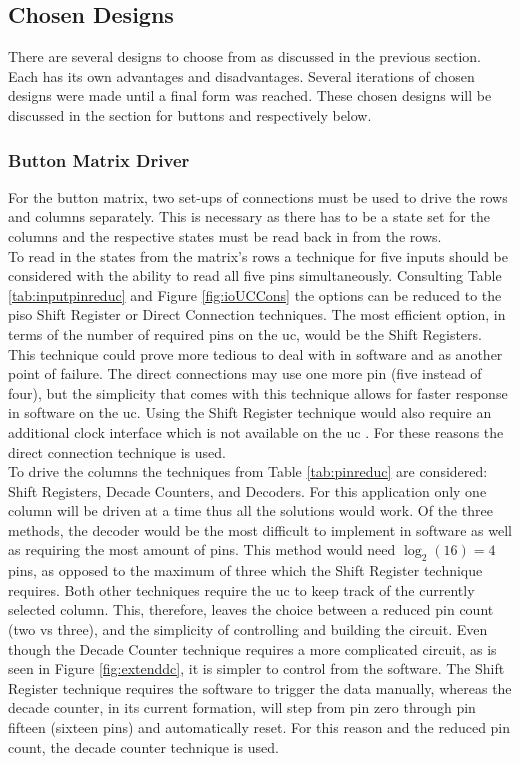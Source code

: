 \documentclass[12pt,a4paper]{report}
\begin{document}
\subsection{Chosen Designs}
There are several designs to choose from as discussed in the previous section. Each has its own advantages and disadvantages. Several iterations of chosen designs were made until a final form was reached. These chosen designs will be discussed in the section for buttons and  respectively below. 
\subsubsection{Button Matrix Driver}
For the button matrix, two set-ups of connections must be used to drive the rows and columns separately. This is necessary as there has to be a state set for the columns and the respective states must be read back in from the rows.\\
To read in the states from the matrix's rows a technique for five inputs should be considered with the ability to read all five pins simultaneously. Consulting Table \ref{tab:inputpinreduc} and Figure \ref{fig:ioUCCons} the options can be reduced to the \ac{piso} Shift Register or Direct Connection techniques. The most efficient option, in terms of the number of required pins on the \ac{uc}, would be the Shift Registers. This technique could prove more tedious to deal with in software and as another point of failure. The direct connections may use one more pin (five instead of four), but the simplicity that comes with this technique allows for faster response in software on the \ac{uc}. Using the Shift Register technique would also require an additional clock interface which is not available on the \ac{uc} \cite{f411}. For these reasons the direct connection technique is used.\\
To drive the columns the techniques from Table \ref{tab:pinreduc} are considered: Shift Registers, Decade Counters, and Decoders. For this application only one column will be driven at a time thus all the solutions would work. Of the three methods, the decoder would be the most difficult to implement in software as well as requiring the most amount of pins. This method would need $\log_2(16) = 4$ pins, as opposed to the maximum of three which the Shift Register technique requires. Both other techniques require the \ac{uc} to keep track of the currently selected column. This, therefore, leaves the choice between a reduced pin count (two vs three), and the simplicity of controlling and building the circuit. Even though the Decade Counter technique requires a more complicated circuit, as is seen in Figure \ref{fig:extenddc}, it is simpler to control from the software. The Shift Register technique requires the software to trigger the data manually, whereas the decade counter, in its current formation, will step from pin zero through pin fifteen (sixteen pins) and automatically reset. For this reason and the reduced pin count, the decade counter technique is used.\\
\end{document}
